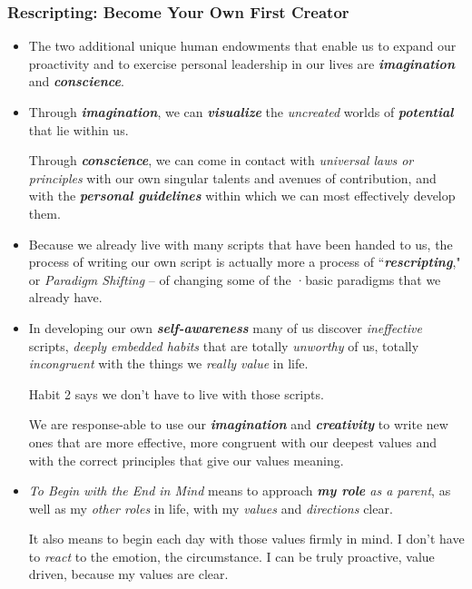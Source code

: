 \documentclass[11pt]{article}
\begin{document}
\subsubsection{Rescripting: Become Your Own First Creator}
\begin{itemize}
\item The two additional unique human endowments that enable us to expand our proactivity and to exercise personal leadership in our lives are \emph{\textbf{imagination}} and \emph{\textbf{conscience}}.

\item Through \emph{\textbf{imagination}}, we can \emph{\textbf{visualize}} the \emph{uncreated} worlds of \emph{\textbf{potential}} that lie within us.

Through \emph{\textbf{conscience}}, we can come in contact with \emph{universal laws or principles} with our own singular talents and avenues of contribution, and with the \emph{\textbf{personal guidelines}} within which we can most effectively develop them. 

\item Because we already live with many scripts that have been handed to us, the process of writing our own script is actually more a process of ``\emph{\textbf{rescripting}}," or \emph{Paradigm Shifting} -- of changing some of the ·basic paradigms that we already have. 

\item In developing our own \emph{\textbf{self-awareness}} many of us discover \emph{ineffective} scripts, \emph{deeply embedded habits} that are totally \emph{unworthy} of us, totally \emph{incongruent} with the things we \emph{really value} in life. 

Habit 2 says we don't have to live with those scripts. 

We are response-able to use our \emph{\textbf{imagination}} and \emph{\textbf{creativity}} to write new ones that are more effective, more congruent with our deepest values and with
the correct principles that give our values meaning.

\item \emph{To Begin with the End in Mind} means to approach \emph{\textbf{my role} as a parent}, as well as my \emph{other roles} in life, with my \emph{values} and \emph{directions} clear.

It also means to begin each day with those values firmly in mind. I don't have to \emph{react} to the emotion, the circumstance. I can be truly proactive, value driven, because my values are clear.
\end{itemize}
\end{document}
